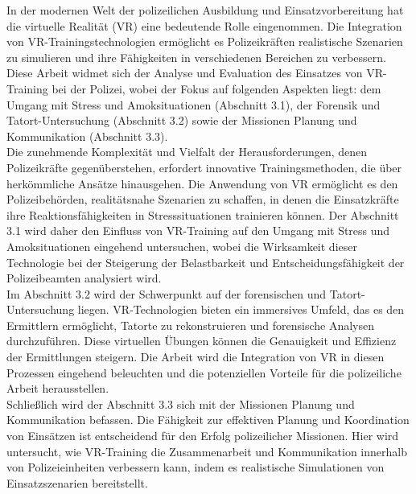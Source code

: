 In der modernen Welt der polizeilichen Ausbildung und Einsatzvorbereitung hat die virtuelle Realität (VR) eine bedeutende Rolle eingenommen. Die Integration von VR-Trainingstechnologien ermöglicht es  Polizeikräften realistische Szenarien zu simulieren und ihre Fähigkeiten in verschiedenen Bereichen zu verbessern. Diese Arbeit widmet sich der Analyse und Evaluation des Einsatzes von VR-Training bei der Polizei, wobei der Fokus auf folgenden Aspekten liegt: dem Umgang mit Stress und Amoksituationen (Abschnitt 3.1), der Forensik und Tatort-Untersuchung (Abschnitt 3.2) sowie der Missionen Planung und Kommunikation (Abschnitt 3.3).
\\
Die zunehmende Komplexität und Vielfalt der Herausforderungen, denen Polizeikräfte gegenüberstehen, erfordert innovative Trainingsmethoden, die über herkömmliche Ansätze hinausgehen. Die Anwendung von VR ermöglicht es den Polizeibehörden, realitätsnahe Szenarien zu schaffen, in denen die Einsatzkräfte ihre Reaktionsfähigkeiten in Stresssituationen trainieren können. Der Abschnitt 3.1 wird daher den Einfluss von VR-Training auf den Umgang mit Stress und Amoksituationen eingehend untersuchen, wobei die Wirksamkeit dieser Technologie bei der Steigerung der Belastbarkeit und Entscheidungsfähigkeit der Polizeibeamten analysiert wird.
\\
Im Abschnitt 3.2 wird der Schwerpunkt auf der forensischen und Tatort-Untersuchung liegen. VR-Technologien bieten ein immersives Umfeld, das es den Ermittlern ermöglicht, Tatorte zu rekonstruieren und forensische Analysen durchzuführen. Diese virtuellen Übungen können die Genauigkeit und Effizienz der Ermittlungen steigern. Die Arbeit wird die Integration von VR in diesen Prozessen eingehend beleuchten und die potenziellen Vorteile für die polizeiliche Arbeit herausstellen.
\\
Schließlich wird der Abschnitt 3.3 sich mit der Missionen Planung und Kommunikation befassen. Die Fähigkeit zur effektiven Planung und Koordination von Einsätzen ist entscheidend für den Erfolg polizeilicher Missionen. Hier wird untersucht, wie VR-Training die Zusammenarbeit und Kommunikation innerhalb von Polizeieinheiten verbessern kann, indem es realistische Simulationen von Einsatzszenarien bereitstellt. 
